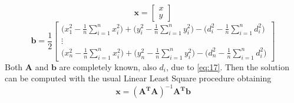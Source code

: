 \documentclass[12pt]{report}
\begin{document}
$$
\mathbf{x}=\begin{bmatrix}
    x\\
    y
\end{bmatrix}
$$
$$\mathbf{b}=\frac{1}{2}
\begin{bmatrix}
\bigg(x_1^2-\frac{1}{n}\sum_{i=1}^nx^2_i\bigg)+\bigg(y_i^2-\frac{1}{n}\sum_{i=1}^ny^2_i\bigg)-\bigg(d_i^2-\frac{1}{n}\sum_{i=1}^nd_i^2\bigg)\\
\vdots\\
\bigg(x_n^2-\frac{1}{n}\sum_{i=1}^nx^2_i\bigg)+\bigg(y_n^2-\frac{1}{n}\sum_{i=1}^ny^2_i\bigg)-\bigg(d_n^2-\frac{1}{n}\sum_{i=1}^nd_i^2\bigg)
\end{bmatrix}
$$
Both $\mathbf{A}$ and $\mathbf{b}$ are completely known, also $d_i$, due to \ref{eq:17}. Then the solution can be computed with the usual Linear Least Square procedure obtaining
\begin{equation}
    \mathbf{x}=(\mathbf{A^TA})^{-1}\mathbf{A^Tb}
\end{equation}
\clearpage
\end{document}
